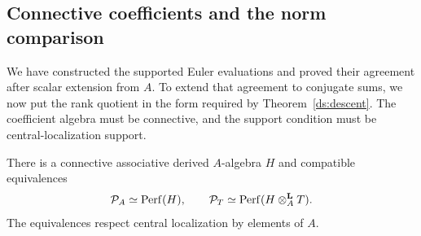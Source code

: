 \subsection{Connective coefficients and the norm comparison}

We have constructed the supported Euler evaluations and proved their
agreement after scalar extension from $A$. To extend that agreement
to conjugate sums, we now put the rank quotient in the form required
by Theorem~\ref{ds:descent}. The coefficient algebra must be
connective, and the support condition must be central-localization
support.

\begin{lemma}
\label{as:connective}
There is a connective associative derived $A$-algebra $H$ and
compatible equivalences
\[
 \mathcal P_A\simeq\operatorname{Perf}(H),
 \qquad
 \mathcal P_T\simeq\operatorname{Perf}(H\otimes_A^{\mathbf L}T).
\]
The equivalences respect central localization by elements of $A$.
\end{lemma}

